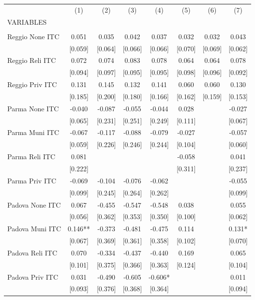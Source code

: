 \begin{tabular}{lccccccc} \hline
 & (1) & (2) & (3) & (4) & (5) & (6) & (7) \\
VARIABLES &  &  &  &  &  &  &  \\ \hline
 &  &  &  &  &  &  &  \\
Reggio None ITC & 0.051 & 0.035 & 0.042 & 0.037 & 0.032 & 0.032 & 0.043 \\
 & [0.059] & [0.064] & [0.066] & [0.066] & [0.070] & [0.069] & [0.062] \\
Reggio Reli ITC & 0.072 & 0.074 & 0.083 & 0.078 & 0.064 & 0.064 & 0.078 \\
 & [0.094] & [0.097] & [0.095] & [0.095] & [0.098] & [0.096] & [0.092] \\
Reggio Priv ITC & 0.131 & 0.145 & 0.132 & 0.141 & 0.060 & 0.060 & 0.130 \\
 & [0.185] & [0.200] & [0.180] & [0.166] & [0.162] & [0.159] & [0.153] \\
Parma None ITC & -0.040 & -0.087 & -0.055 & -0.044 & 0.028 &  & -0.027 \\
 & [0.065] & [0.231] & [0.251] & [0.249] & [0.111] &  & [0.067] \\
Parma Muni ITC & -0.067 & -0.117 & -0.088 & -0.079 & -0.027 &  & -0.057 \\
 & [0.059] & [0.226] & [0.246] & [0.244] & [0.104] &  & [0.060] \\
Parma Reli ITC & 0.081 &  &  &  & -0.058 &  & 0.041 \\
 & [0.222] &  &  &  & [0.311] &  & [0.237] \\
Parma Priv ITC & -0.069 & -0.104 & -0.076 & -0.062 &  &  & -0.055 \\
 & [0.099] & [0.245] & [0.264] & [0.262] &  &  & [0.099] \\
Padova None ITC & 0.067 & -0.455 & -0.547 & -0.548 & 0.038 &  & 0.055 \\
 & [0.056] & [0.362] & [0.353] & [0.350] & [0.100] &  & [0.062] \\
Padova Muni ITC & 0.146** & -0.373 & -0.481 & -0.475 & 0.114 &  & 0.131* \\
 & [0.067] & [0.369] & [0.361] & [0.358] & [0.102] &  & [0.070] \\
Padova Reli ITC & 0.070 & -0.334 & -0.437 & -0.440 & 0.169 &  & 0.065 \\
 & [0.101] & [0.375] & [0.366] & [0.363] & [0.124] &  & [0.104] \\
Padova Priv ITC & 0.031 & -0.490 & -0.605 & -0.606* &  &  & 0.011 \\
 & [0.093] & [0.376] & [0.368] & [0.364] &  &  & [0.094] \\

\end{tabular}
